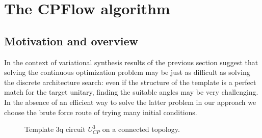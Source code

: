 \documentclass[amsfonts, amssymb, aps, nofootinbib, twocolumn]{revtex4-2}
\begin{document}
\section{The CPFlow algorithm \label{sec cpflow}}
\subsection{Motivation and overview}
In the context of variational synthesis results of the previous section suggest that solving the continuous optimization problem may be just as difficult as solving the discrete architecture search: even if the structure of the template is a perfect match for the target unitary, finding the suitable angles may be very challenging. In the absence of an efficient way to solve the latter problem in our approach we choose the brute force route of trying many initial conditions. 
\begin{figure*}
	\caption{ Template 3q circuit $U_{CP}^3$ on a connected topology.}
	\label{fig cp template}
\end{figure*}
\end{document}
